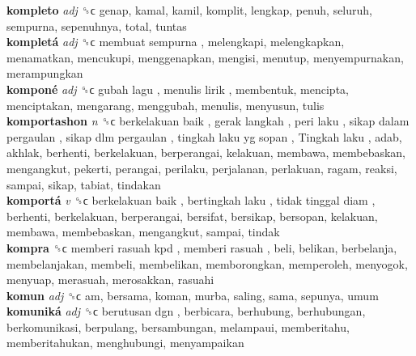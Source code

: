 \textbf{kompleto} \emph{adj}  ␝ϲ  genap, kamal, kamil, komplit, lengkap, penuh, seluruh, sempurna, sepenuhnya, total, tuntas  \\
\textbf{kompletá} \emph{adj}  ␝ϲ   membuat sempurna , melengkapi, melengkapkan, menamatkan, mencukupi, menggenapkan, mengisi, menutup, menyempurnakan, merampungkan  \\
\textbf{komponé} \emph{adj}  ␝ϲ   gubah lagu ,  menulis lirik , membentuk, mencipta, menciptakan, mengarang, menggubah, menulis, menyusun, tulis  \\
\textbf{komportashon} \emph{n}  ␝ϲ   berkelakuan baik ,  gerak langkah ,  peri laku ,  sikap dalam pergaulan ,  sikap dlm pergaulan ,  tingkah laku yg sopan ,  Tingkah laku , adab, akhlak, berhenti, berkelakuan, berperangai, kelakuan, membawa, membebaskan, mengangkut, pekerti, perangai, perilaku, perjalanan, perlakuan, ragam, reaksi, sampai, sikap, tabiat, tindakan  \\
\textbf{komportá} \emph{v}  ␝ϲ   berkelakuan baik ,  bertingkah laku ,  tidak tinggal diam , berhenti, berkelakuan, berperangai, bersifat, bersikap, bersopan, kelakuan, membawa, membebaskan, mengangkut, sampai, tindak  \\
\textbf{kompra} ␝ϲ   memberi rasuah kpd ,  memberi rasuah , beli, belikan, berbelanja, membelanjakan, membeli, membelikan, memborongkan, memperoleh, menyogok, menyuap, merasuah, merosakkan, rasuahi  \\
\textbf{komun} \emph{adj}  ␝ϲ  am, bersama, koman, murba, saling, sama, sepunya, umum  \\
\textbf{komuniká} \emph{adj}  ␝ϲ   berutusan dgn , berbicara, berhubung, berhubungan, berkomunikasi, berpulang, bersambungan, melampaui, memberitahu, memberitahukan, menghubungi, menyampaikan  \\
